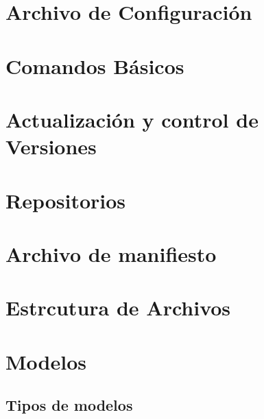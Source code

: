\documentclass[letterpaper,10pt,spanish]{sphinxmanual}
\begin{document}
\section{Archivo de Configuración}
\label{\detokenize{tecnico/entorno/odoo-server:archivo-de-configuracion}}

\section{Comandos Básicos}
\label{\detokenize{tecnico/entorno/odoo-server:comandos-basicos}}

\section{Actualización y control de Versiones}
\label{\detokenize{tecnico/entorno/estructura-addons:actualizacion-y-control-de-versiones}}\label{\detokenize{tecnico/entorno/estructura-addons:estrcutura-addons}}\label{\detokenize{tecnico/entorno/estructura-addons::doc}}

\section{Repositorios}
\label{\detokenize{tecnico/entorno/estructura-addons:repositorios}}

\section{Archivo de manifiesto}
\label{\detokenize{tecnico/entorno/estructura-modulo:archivo-de-manifiesto}}\label{\detokenize{tecnico/entorno/estructura-modulo:estructura-modulo}}\label{\detokenize{tecnico/entorno/estructura-modulo::doc}}

\section{Estrcutura de Archivos}
\label{\detokenize{tecnico/entorno/estructura-modulo:estrcutura-de-archivos}}


\section{Modelos}
\label{\detokenize{tecnico/orm-api/modelos:modelos}}\label{\detokenize{tecnico/orm-api/modelos:id1}}\label{\detokenize{tecnico/orm-api/modelos::doc}}

\subsection{Tipos de modelos}
\label{\detokenize{tecnico/orm-api/modelos:tipos-de-modelos}}
\end{document}
